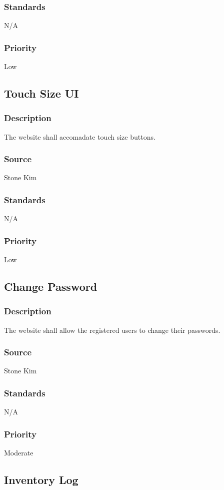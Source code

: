 \subsubsection{Standards}
N/A
\subsubsection{Priority}
Low

\subsection{Touch Size UI}
\subsubsection{Description}
The website shall accomadate touch size buttons.
\subsubsection{Source}
Stone Kim
\subsubsection{Standards}
N/A
\subsubsection{Priority}
Low

\subsection{Change Password}
\subsubsection{Description}
The website shall allow the registered users to change their passwords.
\subsubsection{Source}
Stone Kim
\subsubsection{Standards}
N/A
\subsubsection{Priority}
Moderate

\subsection{Inventory Log}
